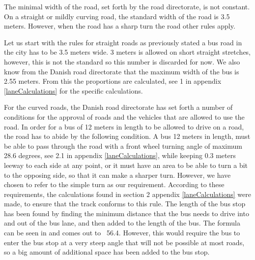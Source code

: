 
The minimal width of the road, set forth by the road directorate, is not constant. On a straight or mildly curving road, the standard width of the road is 3.5 meters. However, when the road has a sharp turn the road other rules apply. 

Let us start with the rules for straight roads as previously stated a bus road in the city has to be 3.5 meters wide\cite{roadRules}. 3 meters is allowed on short straight stretches, however, this is not the standard so this number is discarded for now. We also know from the Danish road directorate that the maximum width of the bus is 2.55 meters\cite{DriveingCurves}. From this the proportions are calculated, see 1 in appendix \ref{laneCalculations} for the specific calculations.

For the curved roads, the Danish road directorate has set forth a number of conditions for the approval of roads and the vehicles that are allowed to use the road. In order for a bus of 12 meters in length to be allowed to drive on a road, the road has to abide by the following condition.
A bus 12 meters in length, must be able to pass through the road with a front wheel turning angle of maximum  28.6 degrees, see 2.1 in appendix \ref{laneCalculations}, while keeping 0.3 meters leeway to each side at any point\cite{DriveingCurves}, or it must have an area to be able to turn a bit to the opposing side, so that it can make a sharper turn. However, we have chosen to refer to the simple turn as our requirement. According to these requirements, the calculations found in section 2 appendix \ref{laneCalculations} were made, to ensure that the track conforms to this rule.
The length of the bus stop has been found by finding the minimum distance that the bus needs to drive into and out of the bus lane, and then added to the length of the bus. The formula can be seen in \cite{busstoplength} and comes out to ~56.4. However, this would require the bus to enter the bus stop at a very steep angle that will not be possible at most roads, so a big amount of additional space has been added to the bus stop.


